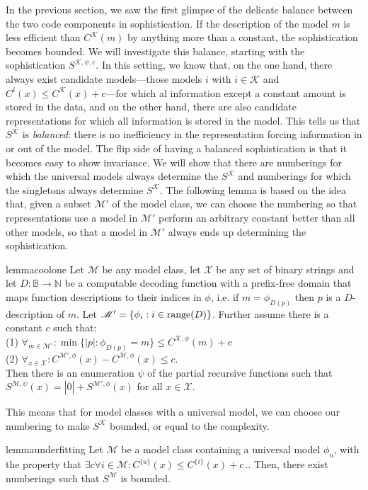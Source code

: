 \documentclass{style/llncs}
\newcommand{\M}{\mathscr M}
\newcommand{\K}{\mathscr K}
\newcommand{\X}{\mathscr X}
\newcommand{\B}{\mathbb B}
\newcommand{\N}{\mathbb N}
\newcommand{\tn}[1]{\textnormal{#1}}
\newcommand{\br}[1]{\overline{#1}}
\newcommand{\s}{S}
\newcommand{\p}{\,\text{.}}
\begin{document}
In the previous section, we saw the first glimpse of the delicate balance between the two code components in sophistication. If the description of the model $m$ is less efficient than $C^\K(m)$ by anything more than a constant, the sophistication becomes bounded. We will investigate this balance, starting with the sophistication $S^{\K,\psi,c}$. In this setting, we know that, on the one hand, there always exist candidate models---those models $i$ with $i \in \K$ and $C^{i}(x) \leq C^\K(x) + c$---for which al information except a constant amount is stored in the data, and on the other hand, there are also candidate representations for which all information is stored in the model. This tells us that $S^\K$ is \emph{balanced}: there is no inefficiency in the representation forcing information in or out of the model.
The flip side of having a balanced sophistication is that it becomes easy to show invariance. We will show that there are numberings for which the universal models always determine the $S^\K$ and numberings for which the singletons always determine $S^\K$. The following lemma is based on the idea that, given a subset $\M'$ of the model class, we can choose the numbering so that representations use a model in $\M'$ perform an arbitrary constant better than all other models, so that a model in $\M'$ always ends up determining the sophistication.
\begin{restatable}{lemma}{coolone}
\label{lemma:thecoolone}
  Let $\M$ be any model class, let $\X$ be any set of binary strings and let $D:\B\to\N$ be a computable decoding function with a prefix-free domain that maps function descriptions to their indices in $\phi$, i.e. if $m=\phi_{D(p)}$ then $p$ is a $D$-description of $m$. Let $\M'=\{\phi_i:i\in\tn{range}(D)\}$. Further assume there is a constant $c$ such that:\\
\-\hspace{1cm}(1) $\forall_{m\in\M'}:\min\{|p|:\phi_{D(p)}=m\}\le C^{\K,\phi}(m)+c$\\
\-\hspace{1cm}(2) $\forall_{x\in\X}:C^{\M',\phi}(x)-C^{\M,\phi}(x)\le c$.\\
Then there is an enumeration $\psi$ of the partial recursive functions such that $S^{\M,\psi}(x) = |\br{0}|+S^{\M',\phi}(x)$ for all $x\in\X$.
\end{restatable}
This means that for model classes with a universal model, we can choose our numbering to make $S^\K$ bounded, or equal to the complexity.
\begin{restatable}[underfitting]{lemma}{underfitting}
Let $\M$ be a model class containing a universal model $\phi_u$, with the property that $\exists c \forall i \in \M : C^{\{u\}}(x) \leq C^{\{i\}}(x) + c \p$. Then, there exist numberings such that $\s^\M$ is bounded.
\end{restatable}
\end{document}
